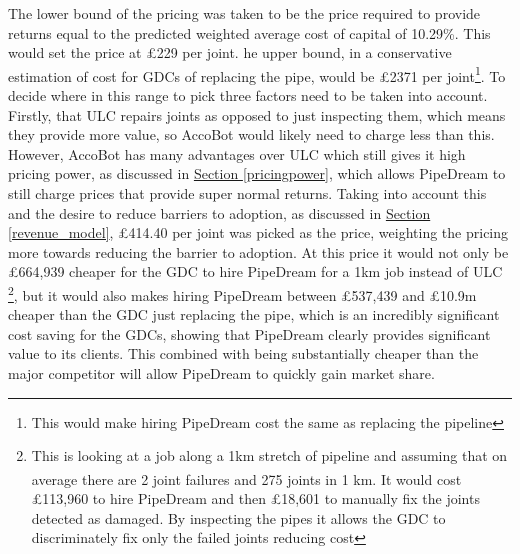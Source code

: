 \documentclass[11pt]{article}		%
\newcommand{\supercite}[1]{\textsuperscript{\cite{#1}}}		%
\newcommand{\sectref}[1]{\hyperref[#1]{Section \ref*{#1}}}     %
\begin{document}
                The lower bound of the pricing was taken to be the price required to provide returns equal to the predicted weighted average cost of capital of 10.29\%.  This would set the price at £229 per joint. he upper bound, in a conservative estimation of cost for GDCs of replacing the pipe, would be £2371 per joint\footnote{This would make hiring PipeDream cost the same as replacing the pipeline}. To decide where in this range to pick three factors need to be taken into account. Firstly, that ULC repairs joints as opposed to just inspecting them, which means they provide more value, so AccoBot would likely need to charge less than this. However, AccoBot has many advantages over ULC which still gives it high pricing power, as discussed in \sectref{pricingpower}, which allows PipeDream to still charge prices that provide super normal returns. Taking into account this and the desire to reduce barriers to adoption, as discussed in \sectref{revenue_model}, £414.40 per joint was picked as the price, weighting the pricing more towards reducing the barrier to adoption. At this price it would not only be £664,939 cheaper for the GDC to hire PipeDream for a 1km job instead of ULC \footnote{This is looking at a job along a 1km stretch of pipeline and assuming that on average there are 2 joint failures and 275 joints in 1 km.\supercite{SGN_Southern} It would cost £113,960 to hire PipeDream and then £18,601 to manually fix the joints detected as damaged. By inspecting the pipes it allows the GDC to discriminately fix only the failed joints reducing cost}, but it would also makes hiring PipeDream between £537,439 and £10.9m cheaper than the GDC just replacing the pipe, which is an incredibly significant cost saving for the GDCs, showing that PipeDream clearly provides significant value to its clients. This combined with being substantially cheaper than the major competitor will allow PipeDream to quickly gain market share.
                
                
	            
\end{document}
